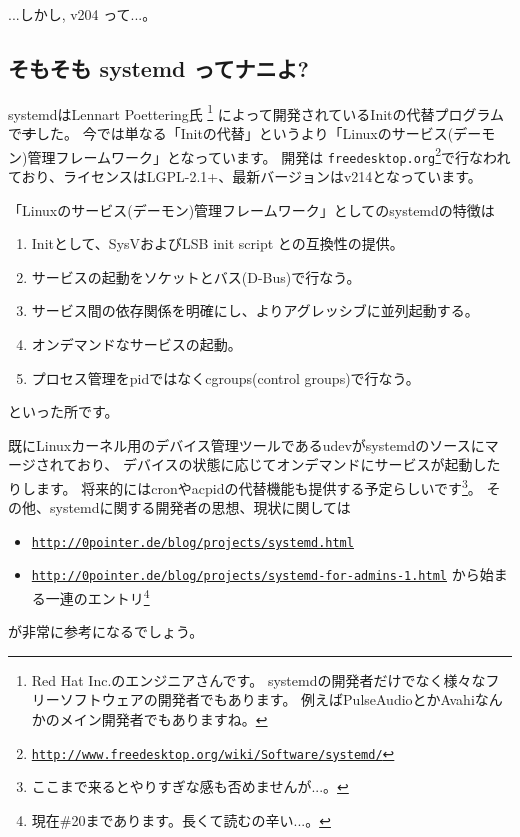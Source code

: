 \documentclass[mingoth,a4paper]{jsarticle}
\begin{document}
...しかし, v204 って...。

\subsection{そもそも systemd ってナニよ?}

systemdはLennart Poettering氏%
\footnote{Red Hat Inc.のエンジニアさんです。%
  systemdの開発者だけでなく様々なフリーソフトウェアの開発者でもあります。%
  例えばPulseAudioとかAvahiなんかのメイン開発者でもありますね。}%
によって開発されているInitの代替プログラムで\sout{す}した。
今では単なる「Initの代替」というより「Linuxのサービス(デーモン)管理フレームワーク」となっています。
開発は
\texttt{freedesktop.org}\footnote{%
  \href{http://www.freedesktop.org/wiki/Software/systemd/}{\texttt{http://www.freedesktop.org/wiki/Software/systemd/}}%
}で行なわれており、ライセンスはLGPL-2.1+、最新バージョンはv214となっています。

「Linuxのサービス(デーモン)管理フレームワーク」としてのsystemdの特徴は
\begin{enumerate}
\item Initとして、SysVおよびLSB init script との互換性の提供。
\item サービスの起動をソケットとバス(D-Bus)で行なう。
\item サービス間の依存関係を明確にし、よりアグレッシブに並列起動する。
\item オンデマンドなサービスの起動。
\item プロセス管理をpidではなくcgroups(control groups)で行なう。
\end{enumerate}
といった所です。

既にLinuxカーネル用のデバイス管理ツールであるudevがsystemdのソースにマージされており、
デバイスの状態に応じてオンデマンドにサービスが起動したりします。
将来的にはcronやacpidの代替機能も提供する予定らしいです\footnote{%
  ここまで来るとやりすぎな感も否めませんが...。
}。
その他、systemdに関する開発者の思想、現状に関しては
\begin{itemize}
\item %
  \href{http://0pointer.de/blog/projects/systemd.html}{\texttt{http://0pointer.de/blog/projects/systemd.html}}
\item %
  \href{http://0pointer.de/blog/projects/systemd-for-admins-1.html}{\texttt{http://0pointer.de/blog/projects/systemd-for-admins-1.html}}
  から始まる一連のエントリ\footnote{現在\#20まであります。長くて読むの辛い...。}
\end{itemize}
が非常に参考になるでしょう。
\end{document}
